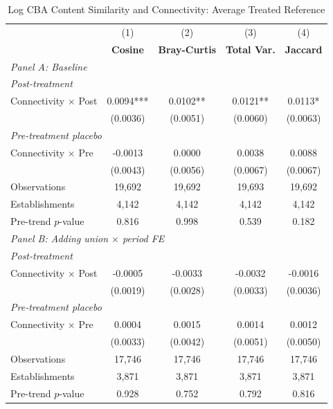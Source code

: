 \begin{table}[H]
\centering
\caption{Log CBA Content Similarity and Connectivity: Average Treated Reference}
\scriptsize
\setlength{\tabcolsep}{8pt}
\begin{tabular}{lcccc}
\hline\hline
 & (1) & (2) & (3) & (4) \\
 & \textbf{Cosine} & \textbf{Bray-Curtis} & \textbf{Total Var.} & \textbf{Jaccard} \\
\hline
\multicolumn{5}{l}{\textit{Panel A: Baseline}} \\
\multicolumn{5}{l}{\textit{Post-treatment}} \\
Connectivity $\times$ Post & 0.0094*** & 0.0102** & 0.0121** & 0.0113* \\
 & (0.0036) & (0.0051) & (0.0060) & (0.0063) \\
\multicolumn{5}{l}{\textit{Pre-treatment placebo}} \\
Connectivity $\times$ Pre & -0.0013 & 0.0000 & 0.0038 & 0.0088 \\
 & (0.0043) & (0.0056) & (0.0067) & (0.0067) \\
\hline
Observations &       19,692 &       19,692 &       19,693 &       19,692 \\
Establishments &        4,142 &        4,142 &        4,142 &        4,142 \\
Pre-trend $p$-value & 0.816 & 0.998 & 0.539 & 0.182 \\
\hline
\multicolumn{5}{l}{\textit{Panel B: Adding union $\times$ period FE}} \\
\multicolumn{5}{l}{\textit{Post-treatment}} \\
Connectivity $\times$ Post & -0.0005 & -0.0033 & -0.0032 & -0.0016 \\
 & (0.0019) & (0.0028) & (0.0033) & (0.0036) \\
\multicolumn{5}{l}{\textit{Pre-treatment placebo}} \\
Connectivity $\times$ Pre & 0.0004 & 0.0015 & 0.0014 & 0.0012 \\
 & (0.0033) & (0.0042) & (0.0051) & (0.0050) \\
\hline
Observations &       17,746 &       17,746 &       17,746 &       17,746 \\
Establishments &        3,871 &        3,871 &        3,871 &        3,871 \\
Pre-trend $p$-value & 0.928 & 0.752 & 0.792 & 0.816 \\
\hline\hline
\end{tabular}
\begin{minipage}{\linewidth}

\end{minipage}
\end{table}
